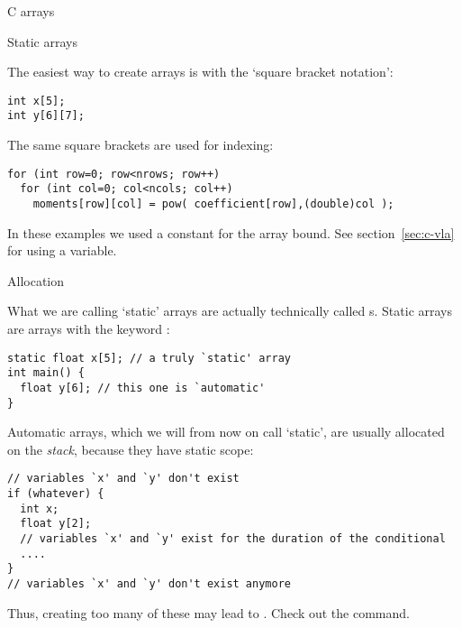 
 {C arrays}
\lstset{language=C}

 {Static arrays}
\label{sec:c-array-static}

The easiest way to create arrays is with the `square bracket notation':
\begin{lstlisting}
int x[5];
int y[6][7];
\end{lstlisting}

The same square brackets are used for indexing:
\begin{lstlisting}
for (int row=0; row<nrows; row++)
  for (int col=0; col<ncols; col++)
    moments[row][col] = pow( coefficient[row],(double)col );
\end{lstlisting}

In these examples we used a constant for the array bound.
See section~\ref{sec:c-vla} for using a variable.

 {Allocation}

What we are calling `static' arrays are actually technically called
s.
Static arrays are arrays with the keyword :
\begin{lstlisting}
static float x[5]; // a truly `static' array
int main() {
  float y[6]; // this one is `automatic'
}
\end{lstlisting}

Automatic arrays, which we will from now on call `static',
are usually allocated on the
\emph{stack},
because they have static scope:
\begin{lstlisting}
// variables `x' and `y' don't exist
if (whatever) {
  int x;
  float y[2];
  // variables `x' and `y' exist for the duration of the conditional
  ....
}
// variables `x' and `y' don't exist anymore
\end{lstlisting}
Thus, creating too many of these may lead to .
Check out the  command.

